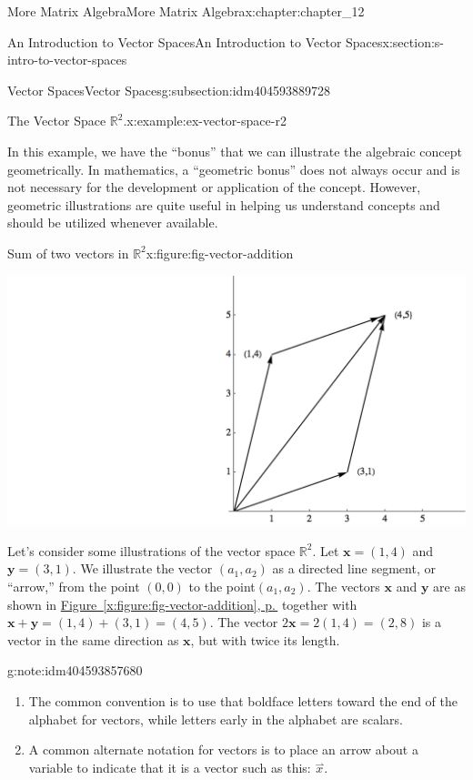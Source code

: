 \documentclass[twoside,10pt,]{book}
\newcommand{\xreffont}{\relax}
\numberwithin{equation}{section}
\renewcommand{\vec}[1]{\mathbf{#1}}
\begin{document}
\begin{chapterptx}{More Matrix Algebra}{}{More Matrix Algebra}{}{}{x:chapter:chapter_12}
\begin{sectionptx}{An Introduction to Vector Spaces}{}{An Introduction to Vector Spaces}{}{}{x:section:s-intro-to-vector-spaces}
\begin{subsectionptx}{Vector Spaces}{}{Vector Spaces}{}{}{g:subsection:idm404593889728}
\begin{example}{The Vector Space \(\mathbb{R}^2\).}{x:example:ex-vector-space-r2}
\par
In this example, we have the ``bonus'' that we can illustrate the algebraic concept geometrically. In mathematics, a ``geometric bonus'' does not always occur and is not necessary for the development or application of the concept. However, geometric illustrations are quite useful in helping us understand concepts and should be utilized whenever available.%
\begin{figureptx}{Sum of two vectors in \(\mathbb{R}^2\)}{x:figure:fig-vector-addition}{}%
\begin{image}{0.2}{0.6}{0.2}%
\includegraphics[width=\linewidth]{images/fig-vector-addition.png}
\end{image}%
\tcblower
\end{figureptx}%
Let's consider some illustrations of the vector space \(\mathbb{R}^2\). Let  \(\vec{x}= (1, 4)\) and \(\vec{y} = (3, 1)\). We illustrate the vector \(\left(a_1, a_2\right)\) as a directed line segment, or ``arrow,'' from the point \((0, 0)\) to the point\(\left(a_1, a_2\right)\).  The vectors \(\vec{x}\) and \(\vec{y}\) are as shown in \hyperref[x:figure:fig-vector-addition]{Figure~{\xreffont\ref{x:figure:fig-vector-addition}}, p.\,\pageref{x:figure:fig-vector-addition}} together with \(\vec{x}+ \vec{y} = (1, 4) + (3, 1) = (4, 5)\). The vector \(2 \vec{x} = 2(1, 4) = (2, 8)\) is a vector in the same direction as \(\vec{x}\), but with twice its length.%
\end{example}
\begin{note}{}{g:note:idm404593857680}%
%
\begin{enumerate}[label=(\arabic*)]
\item{}The common convention is to use that boldface letters toward the end of the alphabet for vectors, while letters early in the alphabet are scalars.%
\item{}A common alternate notation for vectors is to place an arrow about a variable to indicate that it is a vector such as this:  \(\overset{\rightharpoonup }{x}\).%

\end{enumerate}
\end{note}
\end{subsectionptx}
\end{sectionptx}
\end{chapterptx}
\end{document}
